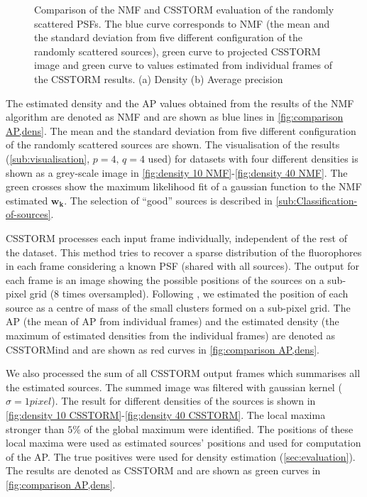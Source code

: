 \begin{figure}[!h]
	\centering
	\newcommand{\sizef}{.38}
	
	\caption{Comparison of the NMF and CSSTORM evaluation of the randomly scattered PSFs. The blue curve corresponds to NMF (the mean and the standard deviation from five different configuration of the randomly scattered sources), green curve to projected CSSTORM image and green curve to values estimated from individual frames of the CSSTORM results. (a) Density (b) Average precision}
	\label{fig:comparison AP,dens}
\end{figure}
%
The estimated density and the AP values obtained from the results of the NMF algorithm are denoted as \textsf{NMF} and are shown as blue lines in \autoref{fig:comparison AP,dens}. The mean and the standard deviation from five different configuration of the randomly scattered sources are shown. The visualisation of the results (\autoref{sub:visualisation}, $p=4,\,q=4$ used) for datasets with four different densities is shown as a grey-scale image in \autoref{fig:density 10 NMF}-\ref{fig:density 40 NMF}. The green crosses show the maximum likelihood fit of a gaussian function to the NMF estimated $\bm{w_{k}}$. The selection of ``good'' sources is described in \autoref{sub:Classification-of-sources}.

CSSTORM processes each input frame individually, independent of the rest of the dataset. This method tries to recover a sparse distribution of the fluorophores in each frame considering a known PSF (shared with all sources). The output for each frame is an image showing the possible positions of the sources on a sub-pixel grid (8 times oversampled). Following \cite{Zhu2012}, we estimated the position of each source as a centre of mass of the small clusters formed on a sub-pixel grid. The AP (the mean of AP from individual frames) and the estimated density (the maximum of estimated densities from the individual frames) are denoted as \textsf{CSSTORMind} and are shown as red curves in \autoref{fig:comparison AP,dens}. 

We also processed the sum of all CSSTORM output frames which summarises all the estimated sources. The summed image was filtered with gaussian kernel ($\sigma=1\unit{pixel}$). The result for different densities of the sources is shown in \autoref{fig:density 10 CSSTORM}-\ref{fig:density 40 CSSTORM}. The local maxima stronger than $5\%$ of the global maximum were identified. The positions of these local maxima were used as estimated sources' positions and used for computation of the AP. The true positives were used for density estimation (\autoref{sec:evaluation}). The results are denoted as \textsf{CSSTORM} and are shown as green curves in \autoref{fig:comparison AP,dens}.

